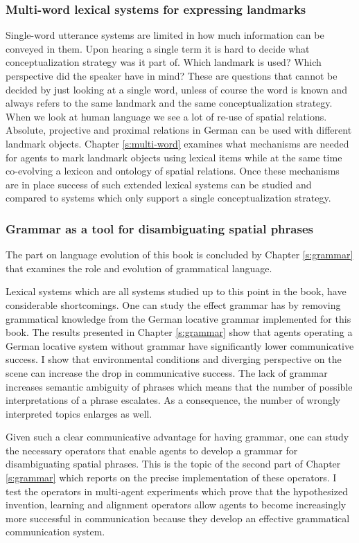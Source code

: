 \subsubsection{Multi-word lexical systems for expressing landmarks}
Single-word utterance systems are limited in how much information can be conveyed
in them. Upon hearing a single term it is hard to decide what conceptualization
strategy was it part of. Which landmark is used? Which perspective
did the speaker have in mind? These are questions that cannot be decided
by just looking at a single word, unless of course the word is known and always
refers to the same landmark and the same conceptualization strategy.
When we look at human language we see a lot of re-use of spatial relations.
Absolute, projective and proximal relations in German can be used with
different landmark objects. Chapter \ref{s:multi-word} examines what mechanisms
are needed for agents to mark landmark objects using lexical items 
while at the same time co-evolving a lexicon and ontology of spatial relations. 
Once these mechanisms are in place success of such extended lexical systems
can be studied and compared to systems which only support a single
conceptualization strategy.

\subsubsection{Grammar as a tool for disambiguating spatial phrases}
The part on language evolution of this book is concluded by Chapter \ref{s:grammar} that examines
the role and evolution of grammatical language. 

Lexical systems which are all systems studied up to this point in the book, 
have considerable shortcomings. One can study the effect grammar has by removing
grammatical knowledge from the German locative grammar implemented for this
book. The results presented in Chapter \ref{s:grammar} show that agents operating a 
German locative system without grammar have significantly lower communicative 
success. I show that environmental conditions and diverging perspective on the scene can increase 
the drop in communicative success. The lack of grammar increases semantic
ambiguity of phrases which means that the number of possible interpretations
of a phrase escalates. As a consequence, the number of wrongly interpreted topics enlarges
as well.

Given such a clear communicative advantage for having grammar, one can 
study the necessary operators that enable agents to develop a grammar for 
disambiguating spatial phrases. This is the topic of the second part of 
Chapter \ref{s:grammar} which reports on the precise implementation of these operators.
I test the operators in multi-agent experiments which prove that the 
hypothesized invention, learning and alignment operators allow agents 
to become increasingly more successful in communication because 
they develop an effective grammatical communication system.

%
% 
% 
% 